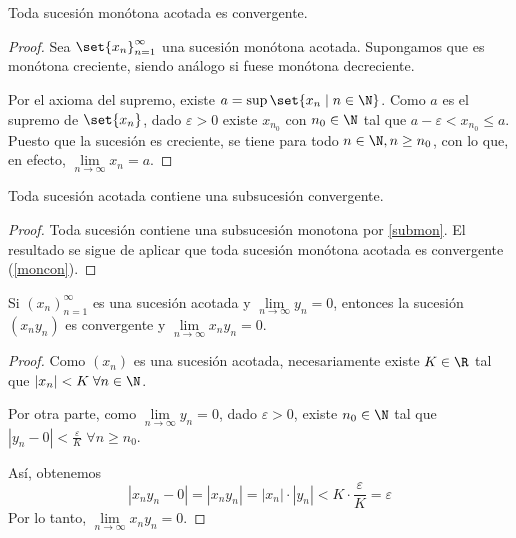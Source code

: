 \begin{proposition}
	\label{moncon}
	Toda sucesión monótona acotada es convergente.
\end{proposition}
\begin{proof}
	Sea \(\set{x_n}^{\infty}_{n = 1} \) una sucesión monótona acotada. Supongamos que es monótona creciente, siendo análogo si fuese monótona decreciente.

	Por el axioma del supremo, existe \(a = \sup \set{x_n \mid n \in \N }\). Como \(a \) es el supremo de \(\set{x_n}\), dado \(\varepsilon > 0\) existe \(x_{n_0} \) con \(n_0 \in \N\) tal que \(a - \varepsilon < x_{n_0} \leq a\). Puesto que la sucesión es creciente, se tiene para todo \( n \in \N, n \geq  n_0\), con lo que, en efecto, \(\lim\limits_{n \to \infty} x_n = a\).
\end{proof}
\begin{theorem}
	Toda sucesión acotada contiene una subsucesión convergente.
\end{theorem}
\begin{proof}
	Toda sucesión contiene una subsucesión monotona por \ref{submon}. El resultado se sigue de aplicar que toda sucesión monótona acotada es convergente (\ref{moncon}).
\end{proof}

\begin{theorem}
	Si \((x_n)^{\infty}_{n=1} \) es una sucesión acotada y \(\lim\limits_{n \to \infty} y_n = 0 \), entonces la sucesión \((x_n y_n )\) es convergente y \(\lim\limits_{n \to \infty} x_n y_n = 0 \).
\end{theorem}
\begin{proof}
	Como \((x_n )\) es una sucesión acotada, necesariamente existe \(K \in \R \) tal que \(\left\vert x_n  \right\vert < K \; \forall n \in \N \).

	Por otra parte, como \(\lim\limits_{n \to \infty} y_n = 0\), dado \(\varepsilon > 0 \), existe \(n_0 \in \N \) tal que \(\left\vert y_n - 0  \right\vert < \frac{\varepsilon}{K} \; \forall n \geq n_0\).

	Así, obtenemos
	\[
		\left\vert x_n y_n - 0  \right\vert = \left\vert x_n y_n  \right\vert = \left\vert x_n  \right\vert \cdot \left\vert y_n  \right\vert < K \cdot \frac{\varepsilon}{K} = \varepsilon
	\]
	Por lo tanto, \(\lim\limits_{n \to \infty} x_n y_n = 0 \).
\end{proof}


